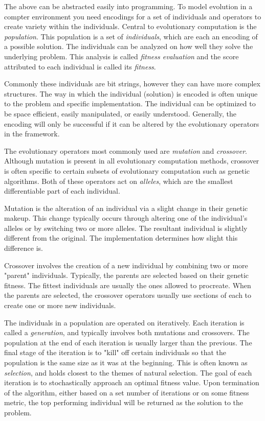 \documentclass[10pt,letterpaper]{article}
\begin{document}
The above can be abstracted easily into programming. To model evolution in a compter environment you need encodings for a set of individuals and operators to create variety within the individuals. Central to evolutionary computation is the \textit{population}. This population is a set of \textit{individuals}, which are each an encoding of a possible solution. The individuals can be analyzed on how well they solve the underlying problem. This analysis is called \textit{fitness evaluation} and the score attributed to each individual is called its \textit{fitness}.

Commonly these individuals are bit strings, however they can have more complex structures. The way in which the individual (solution) is encoded is often unique to the problem and specific implementation. The individual can be optimized to be space efficient, easily manipulated, or easily understood. Generally, the encoding will only be successful if it can be altered by the evolutionary operators in the framework. 

The evolutionary operators most commonly used are \textit{mutation} and \textit{crossover}. Although mutation is present in all evolutionary computation methods, crossover is often specific to certain subsets of evolutionary computation such as genetic algorithms. Both of these operators act on \textit{alleles}, which are the smallest differentiable part of each individual. %

Mutation is the alteration of an individual via a slight change in their genetic makeup. This change typically occurs through altering one of the individual's alleles or by switching two or more alleles. The resultant individual is slightly different from the original. The implementation determines how slight this difference is.

Crossover involves the creation of a new individual by combining two or more "parent" individuals. Typically, the parents are selected based on their genetic fitness. The fittest individuals are usually the ones allowed to procreate. When the parents are selected, the crossover operators usually use sections of each to create one or more new individuals.  

The individuals in a population are operated on iteratively. Each iteration is called a \textit{generation}, and typically involves both mutations and crossovers. The population at the end of each iteration is usually larger than the previous. The final stage of the iteration is to "kill" off certain individuals so that the population is the same size as it was at the beginning. This is often known as \textit{selection}, and holds closest to the themes of natural selection. The goal of each iteration is to stochastically approach an optimal fitness value. Upon termination of the algorithm, either based on a set number of iterations or on some fitness metric, the top performing individual will be returned as the solution to the problem.
\end{document}
